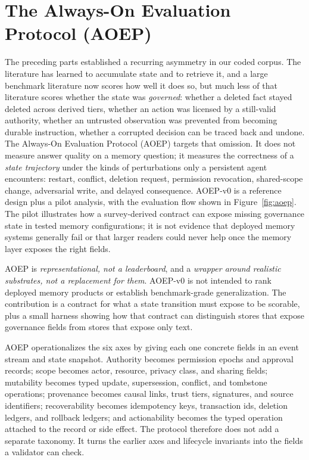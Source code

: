 \section{The Always-On Evaluation Protocol (AOEP)}\label{sec:aoep}


The preceding parts established a recurring asymmetry in our coded corpus. The literature has learned to accumulate state and to retrieve it, and a large benchmark literature now scores how well it does so, but much less of that literature scores whether the state was \emph{governed}: whether a deleted fact stayed deleted across derived tiers, whether an action was licensed by a still-valid authority, whether an untrusted observation was prevented from becoming durable instruction, whether a corrupted decision can be traced back and undone. The Always-On Evaluation Protocol (AOEP) targets that omission. It does not measure answer quality on a memory question; it measures the correctness of a \emph{state trajectory} under the kinds of perturbations only a persistent agent encounters: restart, conflict, deletion request, permission revocation, shared-scope change, adversarial write, and delayed consequence. AOEP-v0 is a reference design plus a pilot analysis, with the evaluation flow shown in Figure~\ref{fig:aoep}. The pilot illustrates how a survey-derived contract can expose missing governance state in tested memory configurations; it is not evidence that deployed memory systems generally fail or that larger readers could never help once the memory layer exposes the right fields.

AOEP is \emph{representational, not a leaderboard}, and a \emph{wrapper around realistic substrates, not a replacement for them}. AOEP-v0 is not intended to rank deployed memory products or establish benchmark-grade generalization. The contribution is a contract for what a state transition must expose to be scorable, plus a small harness showing how that contract can distinguish stores that expose governance fields from stores that expose only text.

AOEP operationalizes the six axes by giving each one concrete fields in an event stream and state snapshot. Authority becomes permission epochs and approval records; scope becomes actor, resource, privacy class, and sharing fields; mutability becomes typed update, supersession, conflict, and tombstone operations; provenance becomes causal links, trust tiers, signatures, and source identifiers; recoverability becomes idempotency keys, transaction ids, deletion ledgers, and rollback ledgers; and actionability becomes the typed operation attached to the record or side effect. The protocol therefore does not add a separate taxonomy. It turns the earlier axes and lifecycle invariants into the fields a validator can check.


